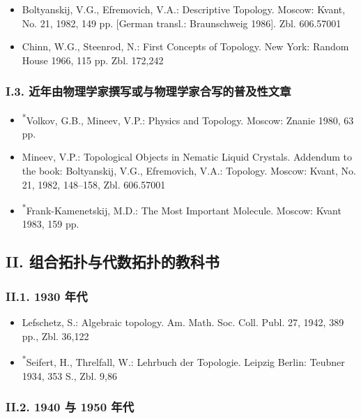 \begin{itemize}
\item Boltyanskij, V.G., Efremovich, V.A.: Descriptive Topology. Moscow: Kvant, No. 21, 1982, 149 pp. [German transl.: Braunschweig 1986]. Zbl. 606.57001
\item Chinn, W.G., Steenrod, N.: First Concepts of Topology. New York: Random House 1966, 115 pp. Zbl. 172,242
\end{itemize}

\subsubsection*{I.3. 近年由物理学家撰写或与物理学家合写的普及性文章}

\begin{itemize}
\item \textsuperscript{*}Volkov, G.B., Mineev, V.P.: Physics and Topology. Moscow: Znanie 1980, 63 pp.
\item Mineev, V.P.: Topological Objects in Nematic Liquid Crystals. Addendum to the book: Boltyanskij, V.G., Efremovich, V.A.: Topology. Moscow: Kvant, No. 21, 1982, 148--158, Zbl. 606.57001
\item \textsuperscript{*}Frank-Kamenetskij, M.D.: The Most Important Molecule. Moscow: Kvant 1983, 159 pp.
\end{itemize}

\subsection*{II. 组合拓扑与代数拓扑的教科书}

\subsubsection*{II.1. 1930 年代}

\begin{itemize}
\item Lefschetz, S.: Algebraic topology. Am. Math. Soc. Coll. Publ. 27, 1942, 389 pp., Zbl. 36,122
\item \textsuperscript{*}Seifert, H., Threlfall, W.: Lehrbuch der Topologie. Leipzig Berlin: Teubner 1934, 353 S., Zbl. 9,86
\end{itemize}

\subsubsection*{II.2. 1940 与 1950 年代}


